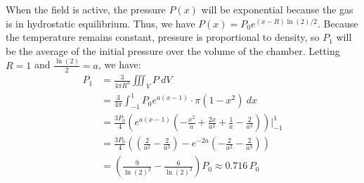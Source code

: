 \begin{solution}
When the field is active, the pressure $P(x)$ will be exponential because the gas is in hydrostatic equilibrium. Thus, we have $P(x) = P_0 e^{(x-R)\ln(2)/2}$. Because the temperature remains constant, pressure is proportional to density, so $P_1$ will be the average of the initial pressure over the volume of the chamber. Letting $R=1$ and $\displaystyle\frac{\ln(2)}{2} = a$, we have:
\begin{align*}P_{1} &= \frac{3}{4\pi R^3}\iiint_{V}P\ dV\\ &= \frac{3}{4\pi }\int_{-1}^{1}P_{0}e^{a(x-1)}\cdot \pi(1-x^{2})\ dx\\ &= \frac{3P_{0}}{4}\left(e^{a(x-1)}\left(-\frac{x^{2}}{a} + \frac{2x}{a^{2}} + \frac{1}{a} - \frac{2}{a^3}\right)\right)\bigg\vert_{-1}^1\\
&= \frac{3P_0}{4}\left(\left(\frac{2}{a^2}-\frac{2}{a^3}\right)-e^{-2a}\left(-\frac{2}{a^2} -\frac{2}{a^3}\right)\right)\\
&= \boxed{\left(\frac{9}{\ln(2)^{2}} - \frac{6}{\ln(2)^{3}}\right)P_0}\approx 0.716\,P_0\end{align*}
\end{solution}